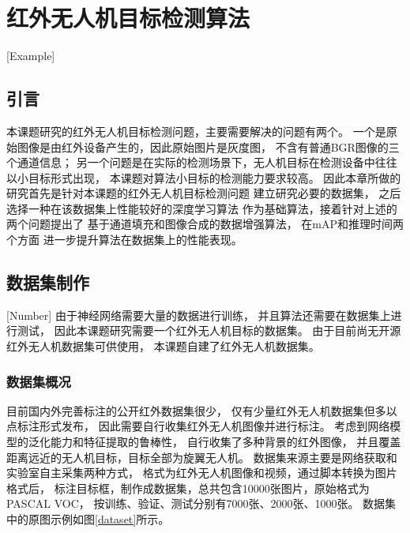 
\chapter{红外无人机目标检测算法}[Example]

\section{引言}
本课题研究的红外无人机目标检测问题，主要需要解决的问题有两个。
一个是原始图像是由红外设备产生的，因此原始图片是灰度图，
不含有普通BGR图像的三个通道信息；
另一个问题是在实际的检测场景下，无人机目标在检测设备中往往以小目标形式出现，
本课题对算法小目标的检测能力要求较高。
因此本章所做的研究首先是针对本课题的红外无人机目标检测问题
建立研究必要的数据集，
之后选择一种在该数据集上性能较好的深度学习算法
作为基础算法，接着针对上述的两个问题提出了
基于通道填充和图像合成的数据增强算法，
在mAP和推理时间两个方面
进一步提升算法在数据集上的性能表现。

\section{数据集制作}[Number]
由于神经网络需要大量的数据进行训练，
并且算法还需要在数据集上进行测试，
因此本课题研究需要一个红外无人机目标的数据集。
由于目前尚无开源红外无人机数据集可供使用，
本课题自建了红外无人机数据集。

\subsection{数据集概况}
目前国内外完善标注的公开红外数据集很少，
仅有少量红外无人机数据集但多以点标注形式发布，
因此需要自行收集红外无人机图像并进行标注。
考虑到网络模型的泛化能力和特征提取的鲁棒性，
自行收集了多种背景的红外图像，
并且覆盖距离远近的无人机目标，目标全部为旋翼无人机。
数据集来源主要是网络获取和实验室自主采集两种方式，
格式为红外无人机图像和视频，通过脚本转换为图片格式后，
标注目标框，制作成数据集，总共包含10000张图片，原始格式为PASCAL VOC，
按训练、验证、测试分别有7000张、2000张、1000张。
数据集中的原图示例如图\ref{dataset}所示。

